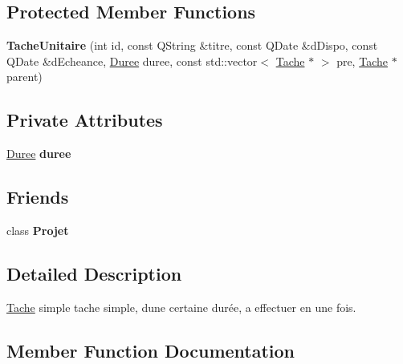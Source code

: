 \subsection*{Protected Member Functions}
\begin{DoxyCompactItemize}
\item 
\hypertarget{class_tache_unitaire_a7091788806d9ce59ba1f6b1dc1e3a92b}{}{\bfseries Tache\+Unitaire} (int id, const Q\+String \&titre, const Q\+Date \&d\+Dispo, const Q\+Date \&d\+Echeance, \hyperlink{class_duree}{Duree} duree, const std\+::vector$<$ \hyperlink{class_tache}{Tache} $\ast$ $>$ pre, \hyperlink{class_tache}{Tache} $\ast$parent)\label{class_tache_unitaire_a7091788806d9ce59ba1f6b1dc1e3a92b}

\end{DoxyCompactItemize}
\subsection*{Private Attributes}
\begin{DoxyCompactItemize}
\item 
\hypertarget{class_tache_unitaire_aca42cdc08900e1419b872c2261c220a5}{}\hyperlink{class_duree}{Duree} {\bfseries duree}\label{class_tache_unitaire_aca42cdc08900e1419b872c2261c220a5}

\end{DoxyCompactItemize}
\subsection*{Friends}
\begin{DoxyCompactItemize}
\item 
\hypertarget{class_tache_unitaire_ab87b41c3faa36955cc370972f5cce344}{}class {\bfseries Projet}\label{class_tache_unitaire_ab87b41c3faa36955cc370972f5cce344}

\end{DoxyCompactItemize}


\subsection{Detailed Description}
\hyperlink{class_tache}{Tache} simple tache simple, d\textquotesingle{}une certaine durée, a effectuer en une fois. 

\subsection{Member Function Documentation}
\hypertarget{class_tache_unitaire_a4472e37f36d315d2e02fe8d743bc6616}{}

